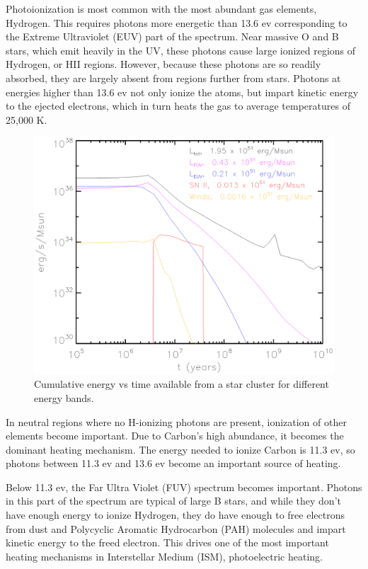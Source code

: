 Photoionization is most common with the most abundant gas elements, Hydrogen. This requires photons more energetic than 13.6 ev corresponding to the Extreme Ultraviolet (EUV) part of the spectrum. Near massive O and B stars, which emit heavily in the UV, these photons cause large ionized regions of Hydrogen, or HII regions. However, because these photons are so readily absorbed, they are largely absent from regions further from stars. Photons at energies higher than 13.6 ev not only ionize the atoms, but impart kinetic energy to the ejected electrons, which in turn heats the gas to average temperatures of 25,000 K.

\begin{figure}
\includegraphics[width=\textwidth]{graphics/UVSN.eps}
\caption[Energy available per band.]{Cumulative energy vs time available from a star cluster for different energy bands.}
\label{fig:bandenergies}
\end{figure}

In neutral regions where no H-ionizing photons are present, ionization of other elements become important. Due to Carbon's high abundance, it becomes the dominant heating mechanism. The energy needed to ionize Carbon is 11.3 ev, so photons between 11.3 ev and 13.6 ev become an important source of heating. 

Below 11.3 ev, the Far Ultra Violet (FUV) spectrum becomes important. Photons in this part of the spectrum are typical of large B stars, and while they don't have enough energy to ionize Hydrogen, they do have enough to free electrons from dust and Polycyclic Aromatic Hydrocarbon (PAH) molecules and impart kinetic energy to the freed electron. This drives one of the most important heating mechanisms in Interstellar Medium (ISM), photoelectric heating.

